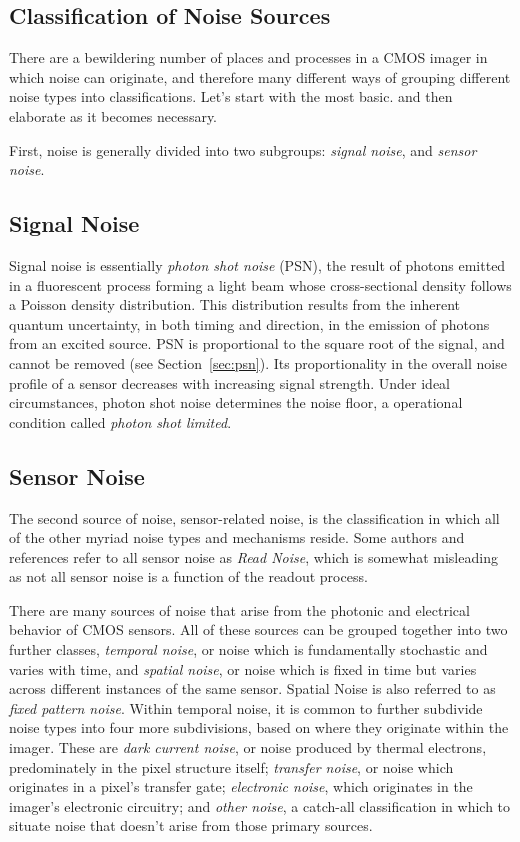 \documentclass[10pt]{article}
\begin{document}
\subsection{Classification of Noise Sources}
\label{sec:classification}

There are a bewildering number of places and processes in a CMOS imager in which noise can originate, and therefore many different ways of grouping different noise types into classifications. Let's start with the most basic. and then elaborate as it becomes necessary. 

First, noise is generally divided into two subgroups: \emph{signal noise}, and \emph{sensor noise}. 

\subsection{Signal Noise}

Signal noise is essentially \emph{photon shot noise} (PSN), the result of photons emitted in a fluorescent process forming a light beam whose cross-sectional density follows a Poisson density distribution.  This distribution results from the inherent quantum uncertainty, in both timing and direction, in the emission of photons from an excited source. PSN is proportional to the square root of the signal, and cannot be removed (see Section~\ref{sec:psn}). Its proportionality in the overall noise profile of a sensor decreases with increasing signal strength. Under ideal circumstances, photon shot noise determines the noise floor, a operational condition called \emph{photon shot limited}.

\subsection{Sensor Noise}

The second source of noise, sensor-related noise, is the classification in which all of the other  myriad noise types and mechanisms reside. Some authors and references refer to all sensor noise as \emph{Read Noise}, which is somewhat misleading as not all sensor noise is a function of the readout process. 

There are many sources of noise that arise from the photonic and electrical behavior of CMOS sensors. All of these sources can be grouped together into two further classes, \emph{temporal noise}, or noise which is fundamentally stochastic and varies with time, and \emph{spatial noise}, or noise which is fixed in time but varies across different instances of the same sensor. Spatial Noise is also referred to as \emph{fixed pattern noise}. Within temporal noise, it is common to further subdivide noise types into four more subdivisions, based on where they originate within the imager. These are \emph{dark current noise}, or noise produced by thermal electrons, predominately in the pixel structure itself; \emph {transfer noise}, or noise which originates in a pixel's transfer gate; \emph{electronic noise}, which originates in the imager's electronic circuitry; and \emph{other noise}, a catch-all classification in which to situate noise that doesn't arise from those primary sources.
\end{document}
